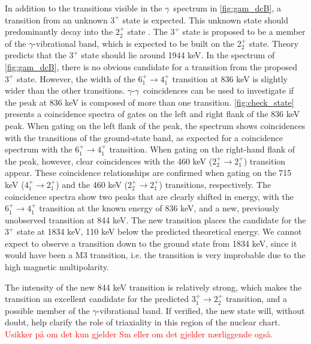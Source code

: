 \documentclass[twoside,english]{uiofysmaster/uiofysmaster}
\newcommand{\ga}{$\gamma$}
\let\orgautoref\autoref
\renewcommand{\autoref}
        {%
		 \def\sectionautorefname{Section}%
		 \def\subsectionautorefname{Section}%
		 \def\subsubsectionautorefname{Section}%
		 \def\chapterautorefname{Chapter}%
          \orgautoref}
\begin{document}
In addition to the transitions visible in the \ga\ spectrum in \autoref{fig:gam_dcB}, a transition from an unknown $3^+$ state is expected.
This unknown state should predominantly decay into the $2_2^+$ state \cite{Klintefjord2016, Samorajczyk2015}.
The $3^+$ state is proposed to be a member of the \ga-vibrational band, which is expected to be built on the $2_2^+$ state.
Theory predicts that the $3^+$ state should lie around 1944 keV.
In the spectrum of \autoref{fig:gam_dcB}, there is no obvious candidate for a transition from the proposed $3^+$ state.
However, the width of the $6_1^+ \rightarrow 4_1^+$ transition at 836 keV is slightly wider than the other transitions. 
\ga-\ga\ coincidences can be used to investigate if the peak at 836 keV is composed of more than one transition. 
\autoref{fig:check_state} presents a coincidence spectra of gates on the left and right flank of the 836 keV peak.
When gating on the left flank of the peak, the spectrum shows coincidences with the transitions of the ground-state band, as expected for a coincidence spectrum with the $6_1^+ \rightarrow 4_1^+$ transition. 
When gating on the right-hand flank of the peak, however, clear coincidences with the 460 keV ($2_2^+ \rightarrow 2_1^+$) transition appear. 
These coincidence relationships are confirmed when gating on the 715 keV ($4_1^+ \rightarrow 2_1^+$) and the 460 keV ($2_2^+ \rightarrow 2_1^+$) transitions, respectively. 
The coincidence spectra show two peaks that are clearly shifted in energy, with the $6_1^+ \rightarrow 4_1^+$ transition at the known energy of 836 keV, and a new, previously unobserved transition at 844 keV. 
The new transition places the candidate for the $3^+$ state at 1834 keV, 110 keV below the predicted theoretical energy. 
We cannot expect to observe a transition down to the ground state from 1834 keV, since it would have been a M3 transition, i.e. the transition is very improbable due to the high magnetic multipolarity.

The intensity of the new 844 keV transition is relatively strong, which makes the transition an excellent candidate for the predicted $3_1^+ \rightarrow 2_2^+$ transition, and a possible member of the \ga-vibrational band. If verified, the new state will, without doubt, help clarify the role of triaxiality in this region of the nuclear chart. 
\textcolor{red}{Usikker på om det kun gjelder Sm eller om det gjelder nærliggende også.}
\end{document}
